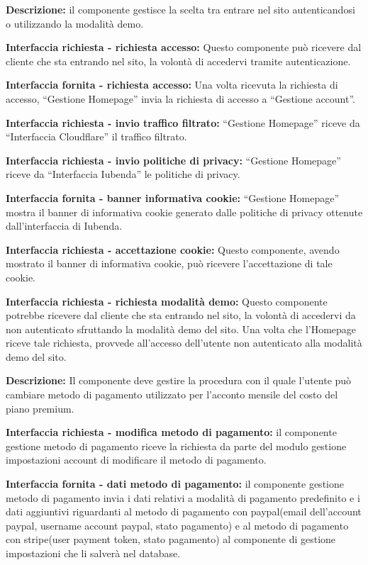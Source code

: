 \begin{listaPersonale}[DCI]{}

    \textbf{Descrizione:} il componente gestisce la scelta tra entrare nel sito autenticandosi o utilizzando la modalità demo.

    \textbf{Interfaccia richiesta - richiesta accesso:} Questo componente può ricevere dal cliente che sta entrando nel sito, la volontà di accedervi tramite autenticazione.

    \textbf{Interfaccia fornita - richiesta accesso:} Una volta ricevuta la richiesta di accesso, “Gestione Homepage” invia la richiesta di accesso a “Gestione account”.

    \textbf{Interfaccia richiesta - invio traffico filtrato:} “Gestione Homepage” riceve da “Interfaccia Cloudflare” il traffico filtrato.

    \textbf{Interfaccia richiesta - invio politiche di privacy:} “Gestione Homepage” riceve da “Interfaccia Iubenda” le politiche di privacy.

    \textbf{Interfaccia fornita - banner informativa cookie:} “Gestione Homepage” mostra il banner di informativa cookie generato dalle politiche di privacy ottenute dall'interfaccia di Iubenda.

    \textbf{Interfaccia richiesta - accettazione cookie:} Questo componente, avendo mostrato il banner di informativa cookie, può ricevere l'accettazione di tale cookie.

    \textbf{Interfaccia richiesta - richiesta modalità demo:} Questo componente potrebbe ricevere dal cliente che sta entrando nel sito, la volontà di accedervi da non autenticato sfruttando la modalità demo del sito. Una volta che l'Homepage riceve tale richiesta, provvede all'accesso dell'utente non autenticato alla modalità demo del sito.



    \textbf{Descrizione:} Il componente deve gestire la procedura con il quale l'utente può cambiare metodo di pagamento utilizzato per l'acconto mensile del costo del piano premium.

    \textbf{Interfaccia richiesta - modifica metodo di pagamento:} il componente gestione metodo di pagamento riceve la richiesta da parte del modulo gestione impostazioni account di modificare il metodo di pagamento.

    \textbf{Interfaccia fornita - dati metodo di pagamento:} il componente gestione metodo di pagamento invia i dati relativi a modalità di pagamento predefinito e i dati aggiuntivi riguardanti al metodo di pagamento con paypal(email dell'account paypal, username account paypal, stato pagamento) e al metodo di pagamento con stripe(user payment token, stato pagamento) al componente di gestione impostazioni che li salverà nel database.


\end{listaPersonale}
